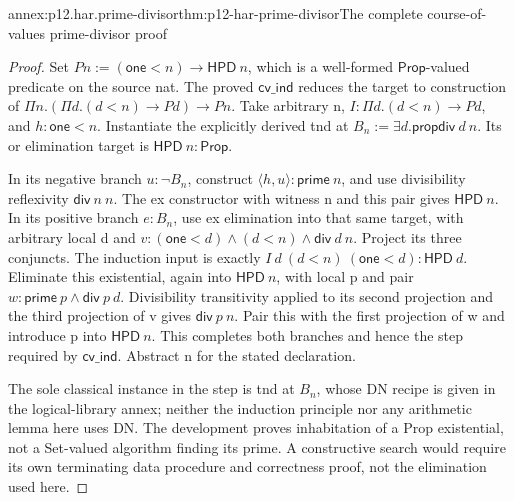 \begin{annexitem}{annex:p12.har.prime-divisor}{thm:p12-har-prime-divisor}{The complete course-of-values prime-divisor proof}
\begin{proof}
Set \(P n:=(\mathsf{one}<n)\to\mathsf{HPD}\ n\), which is a
well-formed \(\mathsf{Prop}\)-valued predicate on the source nat.
The proved \(\mathsf{cv\_ind}\) reduces the target to construction of
\(\Pi n.(\Pi d.(d<n)\to P d)\to P n\).
Take arbitrary n, \(I:\Pi d.(d<n)\to P d\), and
\(h:\mathsf{one}<n\). Instantiate the explicitly derived tnd at
\(B_n:=\exists d.\mathsf{propdiv}\ d\ n\). Its or elimination
target is \(\mathsf{HPD}\ n:\mathsf{Prop}\).

In its negative branch \(u:\neg B_n\), construct
\(\langle h,u\rangle:\mathsf{prime}\ n\), and use divisibility
reflexivity \(\mathsf{div}\ n\ n\). The ex constructor with
witness n and this pair gives \(\mathsf{HPD}\ n\).
In its positive branch \(e:B_n\), use ex elimination into that
same target, with arbitrary local d and
\(v:(\mathsf{one}<d)\wedge(d<n)\wedge\mathsf{div}\ d\ n\).
Project its three conjuncts. The induction input is exactly
\(I\ d\ (d<n)\ (\mathsf{one}<d):\mathsf{HPD}\ d\).
Eliminate this existential, again into \(\mathsf{HPD}\ n\), with
local p and pair \(w:\mathsf{prime}\ p\wedge\mathsf{div}\ p\ d\).
Divisibility transitivity applied to its second projection and the
third projection of v gives \(\mathsf{div}\ p\ n\).
Pair this with the first projection of w and introduce p into
\(\mathsf{HPD}\ n\). This completes both branches and hence the
step required by \(\mathsf{cv\_ind}\). Abstract n for the stated declaration.

The sole classical instance in the step is tnd at \(B_n\), whose
DN recipe is given in the logical-library annex; neither the induction
principle nor any arithmetic lemma here uses DN. The development proves
inhabitation of a Prop existential, not a Set-valued algorithm finding
its prime. A constructive search would require its own terminating
data procedure and correctness proof, not the elimination used here.
\end{proof}
\end{annexitem}

